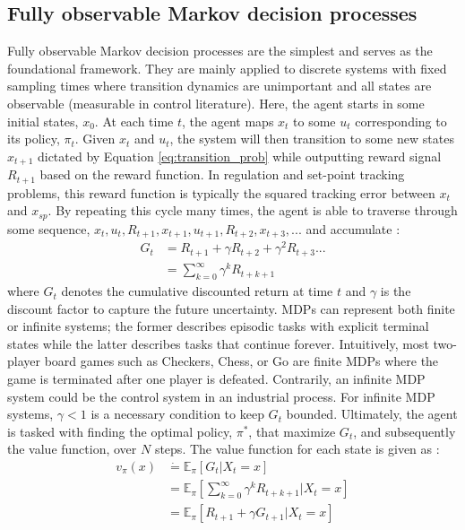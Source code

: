 \subsection{Fully observable Markov decision processes}
Fully observable Markov decision processes are the simplest and serves as the foundational framework.  They are mainly applied to discrete systems with fixed sampling times where transition dynamics are unimportant and all states are observable (measurable in control literature). Here, the agent starts in some initial states, $x_0$. At each time $t$, the agent maps $x_t$ to some $u_t$ corresponding to its policy, $\pi_t$.  Given $x_t$ and $u_t$, the system will then transition to some new states $x_{t+1}$ dictated by Equation \ref{eq:transition_prob} while outputting reward signal $R_{t+1}$ based on the reward function. In regulation and set-point tracking problems, this reward function is typically the squared tracking error between $x_t$ and $x_{sp}$.  By repeating this cycle many times, the agent is able to traverse through some sequence, $x_t, u_t, R_{t+1}, x_{t+1}, u_{t+1}, R_{t+2}, x_{t+3}, ...$ and accumulate \cite{sutton}:
\begin{align}
G_t &= R_{t+1} + \gamma R_{t+2} + \gamma^2 R_{t+3} ... \\
    &= \sum\limits^{\infty}_{k = 0} \gamma^k R_{t+k+1}
\label{eq:return}
\end{align}
where $G_t$ denotes the cumulative discounted return at time $t$ and $\gamma$ is the discount factor to capture the future uncertainty. MDPs can represent both finite or infinite systems; the former describes episodic tasks with explicit terminal states while the latter describes tasks that continue forever.  Intuitively, most two-player board games such as Checkers, Chess, or Go are finite MDPs where the game is terminated after one player is defeated.  Contrarily, an infinite MDP system could be the control system in an industrial process. For infinite MDP systems, $\gamma < 1$ is a necessary condition to keep $G_t$ bounded. Ultimately, the agent is tasked with finding the optimal policy, $\pi^*$, that maximize $G_t$, and subsequently the value function, over $N$ steps. The value function for each state is given as \cite{sutton}:
\begin{align}
    v_\pi (x) &\dot{=} \mathbb{E}_\pi [G_t | X_t = x] \\
              &= \mathbb{E}_\pi \left[\sum\limits^\infty_{k=0} \gamma^k R_{t+k+1} | X_t = x \right] \\
              &= \mathbb{E}_\pi [R_{t+1} + \gamma G_{t+1} | X_t = x]
    \label{eq:value_func}
\end{align}
